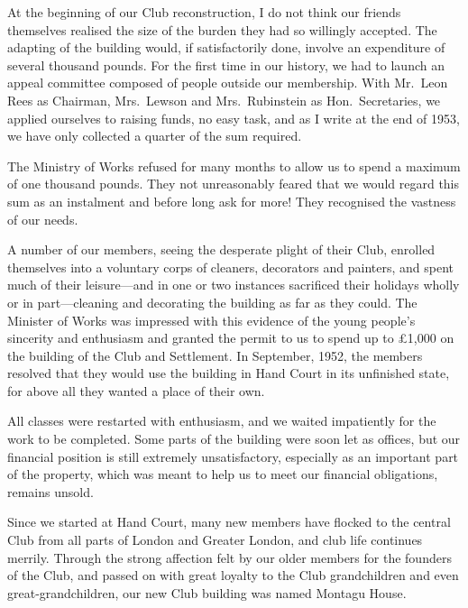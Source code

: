 At the beginning of our Club reconstruction, I do not
think our friends themselves realised the size of the
burden they had so willingly accepted. The adapting
of the building would, if satisfactorily done, involve an
expenditure of several thousand pounds. For the first
time in our history, we had to launch an appeal committee
composed of people outside our membership.
With Mr.\ Leon Rees as Chairman, Mrs.\ Lewson and
Mrs.\ Rubinstein as Hon.\ Secretaries, we applied ourselves
to raising funds, no easy task, and as I write at the end
of 1953, we have only collected a quarter of the sum
required.

The Ministry of Works refused for many months to
allow us to spend a maximum of one thousand pounds.
They not unreasonably feared that we would regard this
sum as an instalment and before long ask for more!
They recognised the vastness of our needs.

A number of our members, seeing the desperate
plight of their Club, enrolled themselves into a voluntary
corps of cleaners, decorators and painters, and spent
much of their leisure—and in one or two instances
sacrificed their holidays wholly or in part—cleaning and
decorating the building as far as they could. The
Minister of Works was impressed with this evidence of
the young people’s sincerity and enthusiasm and
granted the permit to us to spend up to £1,000 on the
building of the Club and Settlement. In September,
1952, the members resolved that they would use the
building in Hand Court in its unfinished state, for above
all they wanted a place of their own.

All classes were restarted with enthusiasm, and we
waited impatiently for the work to be completed. Some
parts of the building were soon let as offices, but our
financial position is still extremely unsatisfactory, especially
as an important part of the property, which was
meant to help us to meet our financial obligations,
remains unsold.

Since we started at Hand Court, many new members
have flocked to the central Club from all parts of London
and Greater London, and club life continues merrily.
Through the strong affection felt by our older members
for the founders of the Club, and passed on with great
loyalty to the Club grandchildren and even
great-grandchildren, our new Club building was named
Montagu House.

